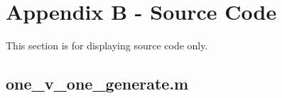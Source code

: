 \documentclass[a4paper, 10pt, conference]{ieeeconf}
\begin{document}




\section{Appendix B - Source Code}

This section is for displaying source code only.

\subsection*{one\_v\_one\_generate.m}

\end{document}
